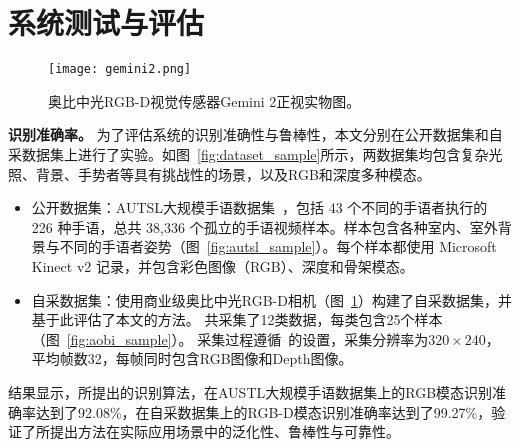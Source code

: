 \section{系统测试与评估}
\begin{figure}
    \centering
    \texttt{[image: gemini2.png]}
    \caption{奥比中光RGB-D视觉传感器Gemini 2正视实物图。}
    \label{fig:aobi_robot}
  \end{figure}
\textbf{识别准确率。}
为了评估系统的识别准确性与鲁棒性，本文分别在公开数据集和自采数据集上进行了实验。如图~\ref{fig:dataset_sample}所示，两数据集均包含复杂光照、背景、手势者等具有挑战性的场景，以及RGB和深度多种模态。
\begin{itemize}
    \item 公开数据集：AUTSL大规模手语数据集~\cite{sincan2020autsl}，包括 43 个不同的手语者执行的 226 种手语，总共 38,336 个孤立的手语视频样本。样本包含各种室内、室外背景与不同的手语者姿势（图~\ref{fig:autsl_sample}）。每个样本都使用 Microsoft Kinect v2 记录，并包含彩色图像（RGB）、深度和骨架模态。
    \item 自采数据集：使用商业级奥比中光RGB-D相机（图~\ref{fig:aobi_robot}）构建了自采数据集，并基于此评估了本文的方法。%
    共采集了12类数据，每类包含25个样本（图~\ref{fig:aobi_sample}）。%
    采集过程遵循~\cite{wan2016chalearn}的设置，采集分辨率为$320\times240$，平均帧数32，每帧同时包含RGB图像和Depth图像。
\end{itemize}
结果显示，所提出的识别算法，在AUSTL大规模手语数据集上的RGB模态识别准确率达到了92.08\%，在自采数据集上的RGB-D模态识别准确率达到了99.27\%，验证了所提出方法在实际应用场景中的泛化性、鲁棒性与可靠性。
